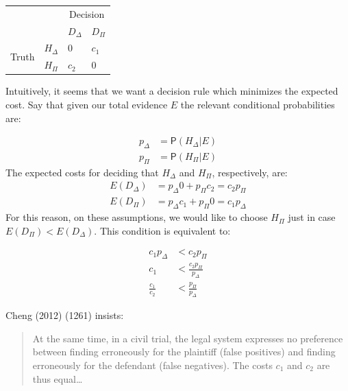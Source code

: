 \documentclass[10pt,dvipsnames,enabledeprecatedfontcommands]{scrartcl}
\newcommand{\pr}[1]{\mathsf{P}(#1)}
\begin{document}
\begin{center}
\begin{tabular}
{@{}llll@{}}
\toprule
& & \multicolumn{2}{c}{Decision}\\
& &  $D_\Delta$ & $D_\Pi$ \\
\cmidrule{3-4}
\multirow{2}{*}{Truth} &  $H_\Delta$    & $0$    & $c_1$\\
                       &  $H_\Pi$       &  $c_2$   & $0$ \\ 
\bottomrule
\end{tabular}
\end{center}

Intuitively, it seems that we want a decision rule which minimizes the
expected cost. Say that given our total evidence \(E\) the relevant
conditional probabilities are:

\vspace{-6mm}

\begin{align*}
p_\Delta &= \pr{H_\Delta \vert E} \\
p_\Pi & = \pr{H_\Pi \vert E}
\end{align*} \noindent The expected costs for deciding that \(H_\Delta\)
and \(H_\Pi\), respectively, are: \begin{align*}
E(D_\Delta) & = p_\Delta 0 + p_\Pi c_2 = c_2p_\Pi\\
E(D_\Pi) & = p_\Delta c_1 + p_\Pi 0 = c_1 p_\Delta
\end{align*} \noindent For this reason, on these assumptions, we would
like to choose \(H_\Pi\) just in case \(E(D_\Pi) < E(D_\Delta)\). This
condition is equivalent to:

\vspace{-6mm}

\begin{align}
\nonumber c_1p_\Delta &< c_2p_\Pi \\
\nonumber c_1 & < \frac{c_2p_\Pi}{p_\Delta}\\
\label{eq:cheng_frac1}\frac{c_1}{c_2} & < \frac{p_\Pi}{p_\Delta}
\end{align}

\noindent Cheng (2012) (1261) insists:

\begin{quote}
At the same time, in a civil trial, the legal system expresses no preference between finding erroneously for the plaintiff (false positives) and finding erroneously for the defendant (false negatives). The costs $c_1$ and $c_2$ are thus equal\dots
\end{quote}
\end{document}
